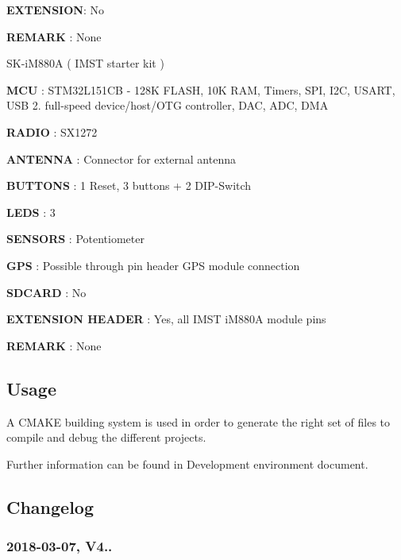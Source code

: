 \begin{DoxyItemize}
\begin{DoxyItemize}
\item {\bfseries E\+X\+T\+E\+N\+S\+I\+ON}\+: No
\item {\bfseries R\+E\+M\+A\+RK} \+: None
\end{DoxyItemize}
\item S\+K-\/i\+M880A ( I\+M\+ST starter kit )
\begin{DoxyItemize}
\item {\bfseries M\+CU} \+: S\+T\+M32\+L151\+CB -\/ 128K F\+L\+A\+SH, 10K R\+AM, Timers, S\+PI, I2C, U\+S\+A\+RT, U\+SB 2. full-\/speed device/host/\+O\+TG controller, D\+AC, A\+DC, D\+MA
\item {\bfseries R\+A\+D\+IO} \+: S\+X1272
\item {\bfseries A\+N\+T\+E\+N\+NA} \+: Connector for external antenna
\item {\bfseries B\+U\+T\+T\+O\+NS} \+: 1 Reset, 3 buttons + 2 D\+I\+P-\/\+Switch
\item {\bfseries L\+E\+DS} \+: 3
\item {\bfseries S\+E\+N\+S\+O\+RS} \+: Potentiometer
\item {\bfseries G\+PS} \+: Possible through pin header G\+PS module connection
\item {\bfseries S\+D\+C\+A\+RD} \+: No
\item {\bfseries E\+X\+T\+E\+N\+S\+I\+ON H\+E\+A\+D\+ER} \+: Yes, all I\+M\+ST i\+M880A module pins
\item {\bfseries R\+E\+M\+A\+RK} \+: None
\end{DoxyItemize}
\end{DoxyItemize}

\subsection*{Usage}

A C\+M\+A\+KE building system is used in order to generate the right set of files to compile and debug the different projects.

Further information can be found in Development environment document.

\subsection*{Changelog}

\subsubsection*{2018-\/03-\/07, V4..}


